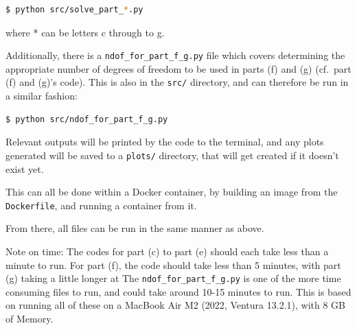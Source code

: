 \documentclass[12pt]{report} %
\begin{document}
\vspace*{1\baselineskip}
\begin{lstlisting}[language=bash, caption={Running the code for each part}]
    $ python src/solve_part_*.py
\end{lstlisting}

where * can be letters c through to g.  

Additionally, there is a \texttt{ndof\_for\_part\_f\_g.py} file which covers determining the appropriate number of degrees of freedom to be used in parts (f) and (g) (cf.\ part (f) and (g)'s code). This is also in the \texttt{src/} directory, and can therefore be run in a similar fashion:  

\vspace*{1\baselineskip}
\begin{lstlisting}[language=bash, caption={Running the number of DoF fitting code}]
    $ python src/ndof_for_part_f_g.py
\end{lstlisting}

Relevant outputs will be printed by the code to the terminal, and any plots generated will be saved to a \texttt{plots/} directory, that will get created if it doesn't exist yet.

This can all be done within a Docker container, by building an image from the \texttt{Dockerfile}, and running a container from it. 

From there, all files can be run in the same manner as above.


Note on time: The codes for part (c) to part (e) should each take less than a minute to run. For part (f), the code should take less than 5 minutes, with part (g) taking a little longer at The \texttt{ndof\_for\_part\_f\_g.py} is one of the more time consuming files to run, and could take around 10-15 minutes to run. This is based on running all of these on a MacBook Air M2 (2022, Ventura 13.2.1), with 8 GB of Memory.
\end{document}
